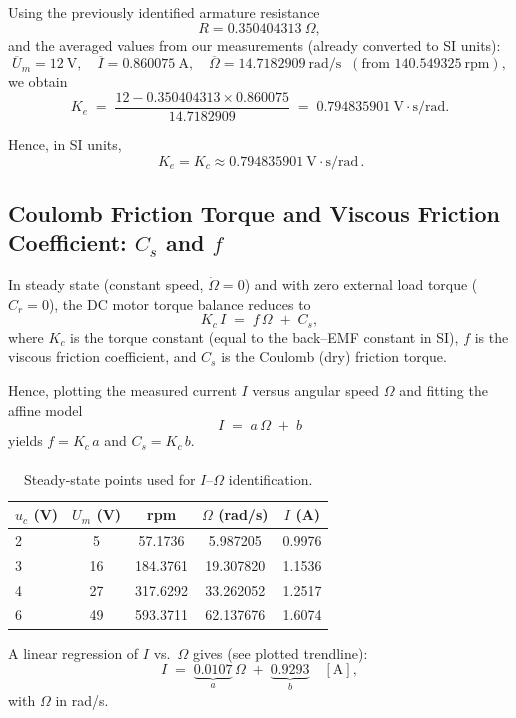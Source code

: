 \documentclass{rapportCS}
\begin{document}
Using the previously identified armature resistance
\[
R = 0.350404313~\Omega,
\]
and the averaged values from our measurements (already converted to SI units):
\[
\overline{U}_m = 12~\text{V},\quad
\overline{I} = 0.860075~\text{A},\quad
\overline{\Omega} = 14.7182909~\text{rad/s} \;\;(\text{from } 140.549325~\text{rpm}),
\]
we obtain
\[
K_e \;=\; \frac{12 - 0.350404313 \times 0.860075}{14.7182909}
\;=\; 0.794835901~\text{V}\cdot\text{s/rad}.
\]

Hence, in SI units,
\[
\boxed{\,K_e = K_c \approx 0.794835901~\text{V}\cdot\text{s/rad}\,}.
\]

\subsection{Coulomb Friction Torque and Viscous Friction Coefficient: $C_s$ and $f$}

In steady state (constant speed, $\dot{\Omega}=0$) and with zero external load torque ($C_r=0$), the DC motor torque balance reduces to
\[
K_c\,I \;=\; f\,\Omega \;+\; C_s ,
\]
where $K_c$ is the torque constant (equal to the back–EMF constant in SI), $f$ is the viscous friction coefficient, and $C_s$ is the Coulomb (dry) friction torque.

Hence, plotting the measured current $I$ versus angular speed $\Omega$ and fitting the affine model
\[
I \;=\; a\,\Omega \;+\; b
\]
yields $f = K_c\,a$ and $C_s = K_c\,b$.

\paragraph{}
\begin{table}[H]
\centering
\caption{Steady-state points used for $I$–$\Omega$ identification.}
\label{tab:friction_data}
\begin{tabular}{lcccc}
\toprule
$u_c$ (V) & $U_m$ (V) & rpm & $\Omega$ (rad/s) & $I$ (A)\\
\midrule
2 & 5  & 57.1736  & 5.987205 & 0.9976 \\
3 & 16 & 184.3761 & 19.307820 & 1.1536 \\
4 & 27 & 317.6292 & 33.262052 & 1.2517 \\
6 & 49 & 593.3711 & 62.137676 & 1.6074 \\
\bottomrule
\end{tabular}
\end{table}

A linear regression of $I$ vs.\ $\Omega$ gives (see plotted trendline):
\[
I \;=\; \underbrace{0.0107}_{a}\,\Omega \;+\; \underbrace{0.9293}_{b}\quad [\mathrm{A}],
\]
with $\Omega$ in rad/s.
\end{document}
